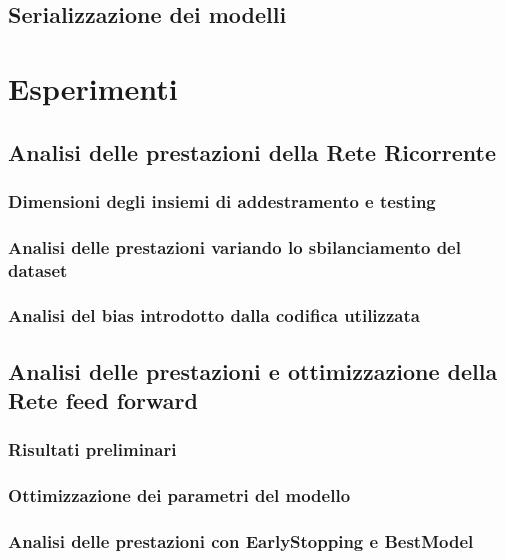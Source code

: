 \documentclass{article}
\begin{document}
\subsection{Serializzazione dei modelli}

\section{Esperimenti}

\subsection{Analisi delle prestazioni della Rete Ricorrente}
\subsubsection{Dimensioni degli insiemi di addestramento e testing}
\subsubsection{Analisi delle prestazioni variando lo sbilanciamento del dataset}
\subsubsection{Analisi del bias introdotto dalla codifica utilizzata}

\subsection{Analisi delle prestazioni e ottimizzazione della Rete feed forward}
\subsubsection{Risultati preliminari}
\subsubsection{Ottimizzazione dei parametri del modello} %
\subsubsection{Analisi delle prestazioni con EarlyStopping e BestModel}
\end{document}

